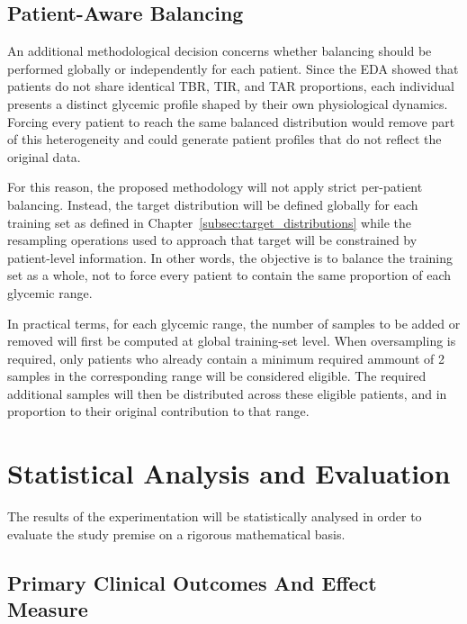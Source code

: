 \subsection{Patient-Aware Balancing}
\label{subsec:experimental_methodology_patient_aware}

An additional methodological decision concerns whether balancing should be performed globally or independently for each patient. Since the EDA showed that patients do not share identical TBR, TIR, and TAR proportions, each individual presents a distinct glycemic profile shaped by their own physiological dynamics. Forcing every patient to reach the same balanced distribution would remove part of this heterogeneity and could generate patient profiles that do not reflect the original data.

For this reason, the proposed methodology will not apply strict per-patient balancing. Instead, the target distribution will be defined globally for each training set as defined in Chapter~\ref{subsec:target_distributions} while the resampling operations used to approach that target will be constrained by patient-level information. In other words, the objective is to balance the training set as a whole, not to force every patient to contain the same proportion of each glycemic range.

In practical terms, for each glycemic range, the number of samples to be added or removed will first be computed at global training-set level. When oversampling is required, only patients who already contain a minimum required ammount of 2 samples in the corresponding range will be considered eligible. The required additional samples will then be distributed across these eligible patients, and in proportion to their original contribution to that range.

\section{Statistical Analysis and Evaluation}
\label{sec:statistical_analysis}

The results of the experimentation will be statistically analysed in order to evaluate the study premise on a rigorous mathematical basis.

\subsection{Primary Clinical Outcomes And Effect Measure}
\label{subsec:primary_clinical_outcome}

